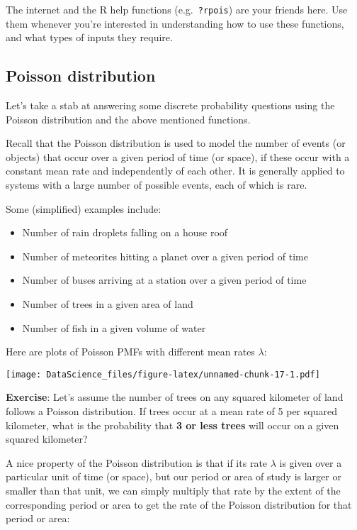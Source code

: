 \documentclass[
]{book}
\begin{document}
The internet and the R help functions (e.g.~\texttt{?rpois}) are your friends here. Use them whenever you're interested in understanding how to use these functions, and what types of inputs they require.

\hypertarget{poisson-distribution}{%
\subsection{Poisson distribution}\label{poisson-distribution}}

Let's take a stab at answering some discrete probability questions using the Poisson distribution and the above mentioned functions.

Recall that the Poisson distribution is used to model the number of events (or objects) that occur over a given period of time (or space), if these occur with a constant mean rate and independently of each other. It is generally applied to systems with a large number of possible events, each of which is rare.

Some (simplified) examples include:

\begin{itemize}
\item
  Number of rain droplets falling on a house roof
\item
  Number of meteorites hitting a planet over a given period of time
\item
  Number of buses arriving at a station over a given period of time
\item
  Number of trees in a given area of land
\item
  Number of fish in a given volume of water
\end{itemize}

Here are plots of Poisson PMFs with different mean rates \(\lambda\):

\texttt{[image: DataScience\_files/figure-latex/unnamed-chunk-17-1.pdf]}

\textbf{Exercise}: Let's assume the number of trees on any squared kilometer of land follows a Poisson distribution. If trees occur at a mean rate of 5 per squared kilometer, what is the probability that \textbf{3 or less trees} will occur on a given squared kilometer?

A nice property of the Poisson distribution is that if its rate \(\lambda\) is given over a particular unit of time (or space), but our period or area of study is larger or smaller than that unit, we can simply multiply that rate by the extent of the corresponding period or area to get the rate of the Poisson distribution for that period or area:
\end{document}
